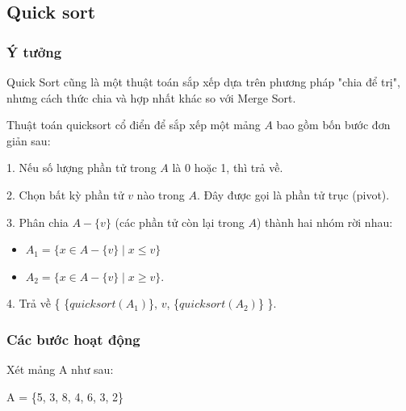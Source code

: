 \subsection{Quick sort}

\subsubsection{Ý tưởng}

Quick Sort cũng là một thuật toán sắp xếp dựa trên phương pháp "chia để trị", nhưng cách thức chia và hợp nhất khác so với Merge Sort.
    

Thuật toán quicksort cổ điển để sắp xếp một mảng $A$ bao gồm bốn bước đơn giản sau:

1. Nếu số lượng phần tử trong $A$ là 0 hoặc 1, thì trả về.

2. Chọn bất kỳ phần tử $v$ nào trong $A$. Đây được gọi là phần tử trục (pivot).

3. Phân chia $A - \{v\}$ (các phần tử còn lại trong $A$) thành hai nhóm rời nhau: 
\begin{itemize}
    \item $A_1 = \{x \in A - \{v\} \mid x \leq v\}$
    \item $A_2 = \{x \in A - \{v\} \mid x \geq v\}$.
\end{itemize}

4. Trả về \{ \{$quicksort(A_1)$\}, $v$, \{$quicksort(A_2)$\} \}.

    
    
\subsubsection{Các bước hoạt động}
Xét mảng A như sau: 
\begin{center}
   A = \{5, 3, 8, 4, 6, 3, 2\} 
\end{center} 

